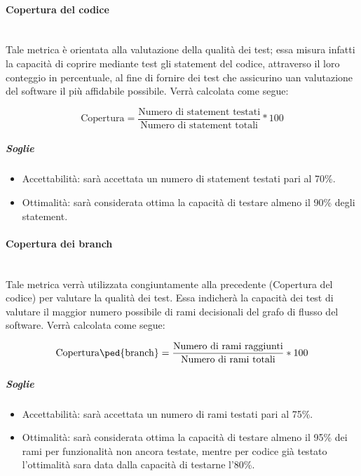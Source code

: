 \paragraph{Copertura del codice}
	~\\Tale metrica è orientata alla valutazione della qualità dei test; essa misura infatti la capacità di coprire mediante test gli statement del codice, attraverso il loro conteggio in percentuale, al fine di fornire dei test che assicurino uan valutazione del software il più affidabile possibile. Verrà calcolata come segue:

	\begin{displaymath}
		\mbox{Copertura} =\frac{\mbox{Numero di statement testati}}{\mbox{Numero di statement totali}} * 100
	\end{displaymath}	
	
\subparagraph{Soglie}
	\begin{itemize}
	\item Accettabilità: sarà accettata un numero di statement testati pari al 70\%.
	\item Ottimalità: sarà considerata ottima la capacità di testare almeno il 90\% degli statement.
	\end{itemize}
	

\paragraph{Copertura dei branch}
	~\\Tale metrica verrà utilizzata congiuntamente alla precedente (Copertura del codice) per valutare la qualità dei test. Essa indicherà la capacità dei test di valutare il maggior numero possibile di rami decisionali del grafo di flusso del software. Verrà calcolata come segue:

	\begin{displaymath}
		\mbox{Copertura\ped{branch}} =\frac{\mbox{Numero di rami raggiunti}}{\mbox{Numero di rami totali}} * 100
	\end{displaymath}	
	
	\subparagraph{Soglie}
	\begin{itemize}
	\item Accettabilità: sarà accettata un numero di rami testati pari al 75\%.
	\item Ottimalità: sarà considerata ottima la capacità di testare almeno il 95\% dei rami per funzionalità non ancora testate, mentre per codice già testato l'ottimalità sara data dalla capacità di testarne l'80\%.
	\end{itemize}
